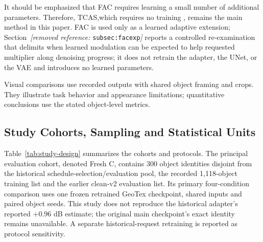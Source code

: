 \documentclass[times,twocolumn,final]{elsarticle}
\providecommand{\DIFadd}[1]{{\protect\color{blue} \sf #1}} %
\providecommand{\DIFdel}[1]{{\protect\color{red} \scriptsize #1}} %
\providecommand{\DIFaddbegin}{} %
\providecommand{\DIFaddend}{} %
\providecommand{\DIFdelbegin}{} %
\providecommand{\DIFdelend}{} %
\begin{document}
\DIFdel{It should be emphasized that FAC requires learning a small number of additional parameters. Therefore, TCAS,which requires no training , remains the main method in this paper. FAC is used only as a learned adaptive extension; Section~\textit{[removed reference: }\texttt{subsec:facexp}\textit{]} reports a controlled re-examination that delimits when learned modulation can be expected to help}\DIFdelend \DIFaddbegin \DIFadd{requested multiplier along denoising progress; it does not retrain the adapter, the UNet, or the VAE and introduces no learned parameters}\DIFaddend .

\DIFdelbegin %
\DIFdelend \DIFaddbegin \DIFadd{Visual comparisons use recorded outputs with shared object framing and crops. They illustrate task behavior and appearance limitations; quantitative conclusions use the stated object-level metrics.
}\DIFaddend

\DIFdelbegin %
\DIFdelend \DIFaddbegin \subsection{Study Cohorts, Sampling and Statistical Units}
\DIFaddend \label{subsec:setup}

\DIFdelbegin %
\DIFdelend \DIFaddbegin \DIFadd{Table~\ref{tab:study-design} summarizes the cohorts and protocols. The principal evaluation cohort, denoted Fresh C, contains 300 object identities disjoint from the historical schedule-selection/evaluation pool, the recorded 1,118-object training list and the earlier clean-v2 evaluation list. Its primary four-condition comparison uses one frozen retrained GeoTex checkpoint, shared inputs and paired object seeds. This study does not reproduce the historical adapter's reported $+0.96$ dB estimate; the original main checkpoint's exact identity remains unavailable. A separate historical-request retraining is reported as protocol sensitivity.
}\DIFaddend
\end{document}
